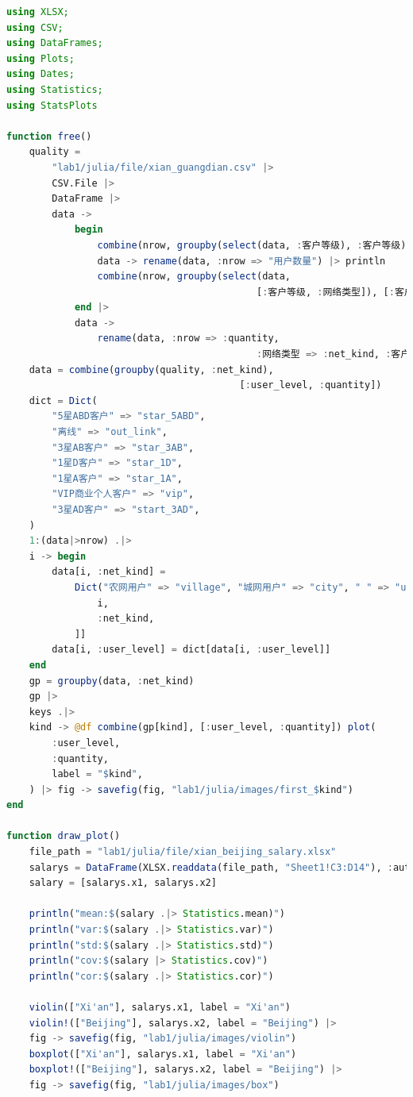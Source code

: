\documentclass[a4paper]{article}
\begin{document}
\begin{lstlisting}[language=julia]
using XLSX;
using CSV;
using DataFrames;
using Plots;
using Dates;
using Statistics;
using StatsPlots

function free()
    quality =
        "lab1/julia/file/xian_guangdian.csv" |>
        CSV.File |>
        DataFrame |>
        data ->
            begin
                combine(nrow, groupby(select(data, :客户等级), :客户等级)) |>
                data -> rename(data, :nrow => "用户数量") |> println
                combine(nrow, groupby(select(data, 
                                            [:客户等级, :网络类型]), [:客户等级, :网络类型]))
            end |>
            data ->
                rename(data, :nrow => :quantity, 
                                            :网络类型 => :net_kind, :客户等级 => :user_level)
    data = combine(groupby(quality, :net_kind),
                                         [:user_level, :quantity])
    dict = Dict(
        "5星ABD客户" => "star_5ABD",
        "离线" => "out_link",
        "3星AB客户" => "star_3AB",
        "1星D客户" => "star_1D",
        "1星A客户" => "star_1A",
        "VIP商业个人客户" => "vip",
        "3星AD客户" => "start_3AD",
    )
    1:(data|>nrow) .|>
    i -> begin
        data[i, :net_kind] =
            Dict("农网用户" => "village", "城网用户" => "city", " " => "unknown")[data[
                i,
                :net_kind,
            ]]
        data[i, :user_level] = dict[data[i, :user_level]]
    end
    gp = groupby(data, :net_kind)
    gp |>
    keys .|>
    kind -> @df combine(gp[kind], [:user_level, :quantity]) plot(
        :user_level,
        :quantity,
        label = "$kind",
    ) |> fig -> savefig(fig, "lab1/julia/images/first_$kind")
end

function draw_plot()
    file_path = "lab1/julia/file/xian_beijing_salary.xlsx"
    salarys = DataFrame(XLSX.readdata(file_path, "Sheet1!C3:D14"), :auto) .|> identity
    salary = [salarys.x1, salarys.x2]

    println("mean:$(salary .|> Statistics.mean)")
    println("var:$(salary .|> Statistics.var)")
    println("std:$(salary .|> Statistics.std)")
    println("cov:$(salary |> Statistics.cov)")
    println("cor:$(salary .|> Statistics.cor)")

    violin(["Xi'an"], salarys.x1, label = "Xi'an")
    violin!(["Beijing"], salarys.x2, label = "Beijing") |>
    fig -> savefig(fig, "lab1/julia/images/violin")
    boxplot(["Xi'an"], salarys.x1, label = "Xi'an")
    boxplot!(["Beijing"], salarys.x2, label = "Beijing") |>
    fig -> savefig(fig, "lab1/julia/images/box")


\end{lstlisting}
\end{document}
